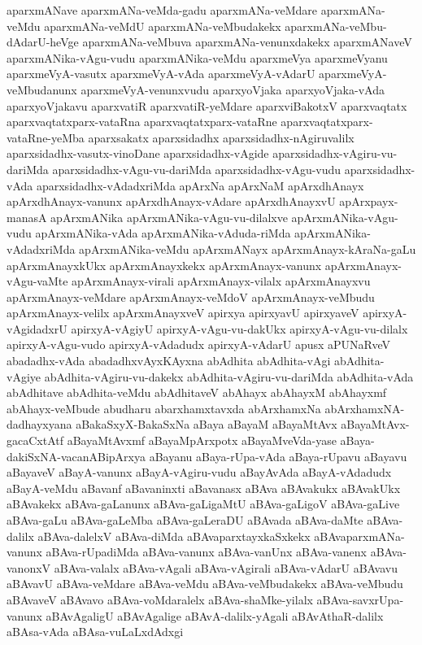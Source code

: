 {aparxmANave
aparxmANa-veMda-gadu
aparxmANa-veMdare
aparxmANa-veMdu
aparxmANa-veMdU
aparxmANa-veMbudakekx
aparxmANa-veMbu-dAdarU-heVge
aparxmANa-veMbuva
aparxmANa-venunxdakekx
aparxmANaveV
aparxmANika-vAgu-vudu
aparxmANika-veMdu
aparxmeVya
aparxmeVyanu
aparxmeVyA-vasutx
aparxmeVyA-vAda
aparxmeVyA-vAdarU
aparxmeVyA-veMbudanunx
aparxmeVyA-venunxvudu
aparxyoVjaka
aparxyoVjaka-vAda
aparxyoVjakavu
aparxvatiR
aparxvatiR-yeMdare
aparxviBakotxV
aparxvaqtatx
aparxvaqtatxparx-vataRna
aparxvaqtatxparx-vataRne
aparxvaqtatxparx-vataRne-yeMba
aparxsakatx
aparxsidadhx
aparxsidadhx-nAgiruvalilx
aparxsidadhx-vasutx-vinoDane
aparxsidadhx-vAgide
aparxsidadhx-vAgiru-vu-dariMda
aparxsidadhx-vAgu-vu-dariMda
aparxsidadhx-vAgu-vudu
aparxsidadhx-vAda
aparxsidadhx-vAdadxriMda
apArxNa
apArxNaM
apArxdhAnayx
apArxdhAnayx-vanunx
apArxdhAnayx-vAdare
apArxdhAnayxvU
apArxpayx-manasA
apArxmANika
apArxmANika-vAgu-vu-dilalxve
apArxmANika-vAgu-vudu
apArxmANika-vAda
apArxmANika-vAduda-riMda
apArxmANika-vAdadxriMda
apArxmANika-veMdu
apArxmANayx
apArxmAnayx-kAraNa-gaLu
apArxmAnayxkUkx
apArxmAnayxkekx
apArxmAnayx-vanunx
apArxmAnayx-vAgu-vaMte
apArxmAnayx-virali
apArxmAnayx-vilalx
apArxmAnayxvu
apArxmAnayx-veMdare
apArxmAnayx-veMdoV
apArxmAnayx-veMbudu
apArxmAnayx-velilx
apArxmAnayxveV
apirxya
apirxyavU
apirxyaveV
apirxyA-vAgidadxrU
apirxyA-vAgiyU
apirxyA-vAgu-vu-dakUkx
apirxyA-vAgu-vu-dilalx
apirxyA-vAgu-vudo
apirxyA-vAdadudx
apirxyA-vAdarU
apusx
aPUNaRveV
abadadhx-vAda
abadadhxvAyxKAyxna
abAdhita
abAdhita-vAgi
abAdhita-vAgiye
abAdhita-vAgiru-vu-dakekx
abAdhita-vAgiru-vu-dariMda
abAdhita-vAda
abAdhitave
abAdhita-veMdu
abAdhitaveV
abAhayx
abAhayxM
abAhayxmf
abAhayx-veMbude
abudharu
abarxhamxtavxda
abArxhamxNa
abArxhamxNA-dadhayxyana
aBakaSxyX-BakaSxNa
aBaya
aBayaM
aBayaMtAvx
aBayaMtAvx-gacaCxtAtf
aBayaMtAvxmf
aBayaMpArxpotx
aBayaMveVda-yase
aBaya-dakiSxNA-vacanABipArxya
aBayanu
aBaya-rUpa-vAda
aBaya-rUpavu
aBayavu
aBayaveV
aBayA-vanunx
aBayA-vAgiru-vudu
aBayAvAda
aBayA-vAdadudx
aBayA-veMdu
aBavanf
aBavaninxti
aBavanasx
aBAva
aBAvakukx
aBAvakUkx
aBAvakekx
aBAva-gaLanunx
aBAva-gaLigaMtU
aBAva-gaLigoV
aBAva-gaLive
aBAva-gaLu
aBAva-gaLeMba
aBAva-gaLeraDU
aBAvada
aBAva-daMte
aBAva-dalilx
aBAva-dalelxV
aBAva-diMda
aBAvaparxtayxkaSxkekx
aBAvaparxmANa-vanunx
aBAva-rUpadiMda
aBAva-vanunx
aBAva-vanUnx
aBAva-vanenx
aBAva-vanonxV
aBAva-valalx
aBAva-vAgali
aBAva-vAgirali
aBAva-vAdarU
aBAvavu
aBAvavU
aBAva-veMdare
aBAva-veMdu
aBAva-veMbudakekx
aBAva-veMbudu
aBAvaveV
aBAvavo
aBAva-voMdaralelx
aBAva-shaMke-yilalx
aBAva-savxrUpa-vanunx
aBAvAgaligU
aBAvAgalige
aBAvA-dalilx-yAgali
aBAvAthaR-dalilx
aBAsa-vAda
aBAsa-vuLaLxdAdxgi
}
